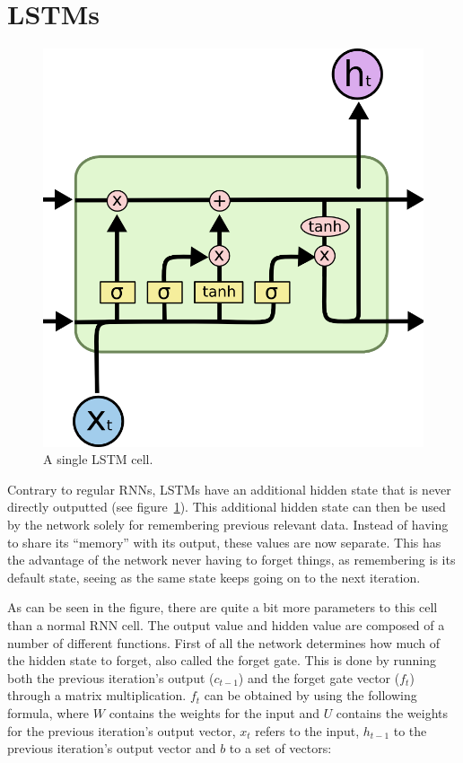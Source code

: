 \section{LSTMs}

\begin{figure}
	\begin{center}
		\includegraphics[scale=0.5]{rnn/lstm_cell}
	\end{center}
	\caption{A single LSTM cell.\label{fig:lstm_cell}}
\end{figure}

Contrary to regular RNNs, LSTMs have an additional hidden state that is never directly outputted (see figure~\ref{fig:lstm_cell}). This additional hidden state can then be used by the network solely for remembering previous relevant data. Instead of having to share its \enquote{memory} with its output, these values are now separate. This has the advantage of the network never having to forget things, as remembering is its default state, seeing as the same state keeps going on to the next iteration.

As can be seen in the figure, there are quite a bit more parameters to this cell than a normal RNN cell. The output value and hidden value are composed of a number of different functions. First of all the network determines how much of the hidden state to forget, also called the forget gate. This is done by running both the previous iteration's output ($c_{t-1}$) and the forget gate vector ($f_t$) through a matrix multiplication. $f_t$ can be obtained by using the following formula, where $W$ contains the weights for the input and $U$ contains the weights for the previous iteration's output vector, $x_t$ refers to the input, $h_{t-1}$ to the previous iteration's output vector and $b$ to a set of vectors:

